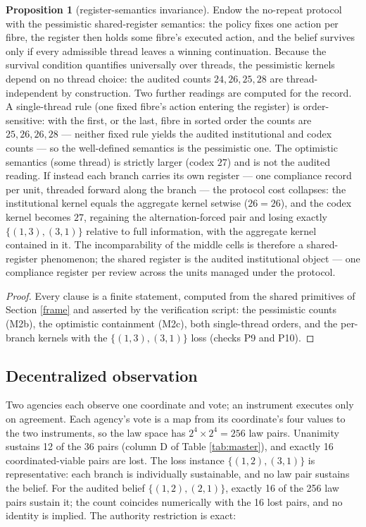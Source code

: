 \documentclass[10pt,twocolumn]{article}
\theoremstyle{definition}
\newtheorem{proposition}{Proposition}
\begin{document}
\begin{proposition}[register-semantics invariance]\label{prop:register}
Endow the no-repeat protocol with the pessimistic shared-register
semantics: the policy fixes one action per fibre, the register then holds
some fibre's executed action, and the belief survives only if every
admissible thread leaves a winning continuation. Because the survival condition
quantifies universally over threads, the
pessimistic kernels depend on no thread choice: the audited counts
\(24, 26, 25, 28\) are thread-independent by construction. Two further
readings are computed for the record. A single-thread rule (one fixed
fibre's action entering the register) is order-sensitive: with the
first, or the last, fibre in sorted order the counts are
\(25, 26, 26, 28\) --- neither fixed rule yields the audited
institutional and codex counts --- so the well-defined semantics is the
pessimistic one. The optimistic semantics (some thread) is strictly
larger (codex \(27\)) and is not the audited reading. If instead each
branch carries its own register --- one compliance record per unit,
threaded forward along the branch --- the protocol cost collapses: the
institutional kernel equals the aggregate kernel setwise (\(26 = 26\)),
and the codex kernel becomes \(27\), regaining the alternation-forced
pair and losing exactly \(\{(1,3),(3,1)\}\) relative to full
information, with the aggregate kernel contained in it. The
incomparability of the middle cells is therefore a shared-register
phenomenon; the shared register is the audited institutional object ---
one compliance register per review across the units managed under the
protocol.
\end{proposition}

\begin{proof}
Every clause is a finite statement, computed from the shared primitives
of Section \ref{frame} and asserted by the verification script: the
pessimistic counts (M2b), the optimistic containment (M2c), both
single-thread orders, and the per-branch kernels with the
\(\{(1,3),(3,1)\}\) loss (checks P9 and P10).
\end{proof}

\subsection{Decentralized observation}\label{decentralized}

Two agencies each observe one coordinate and vote; an instrument
executes only on agreement. Each agency's vote is a map from its
coordinate's four values to the two instruments, so the law space has
\(2^{4} \times 2^{4} = 256\) law pairs. Unanimity sustains 12 of the
36 pairs (column D of Table \ref{tab:master}), and exactly 16
coordinated-viable pairs are lost. The loss instance
\(\{(1,2),(3,1)\}\) is representative: each branch is individually
sustainable, and no law pair sustains the belief. For the audited belief
\(\{(1,2),(2,1)\}\), exactly 16 of the 256 law pairs sustain it; the
count coincides numerically with the 16 lost pairs, and no identity is
implied. The authority restriction is exact:
\end{document}

